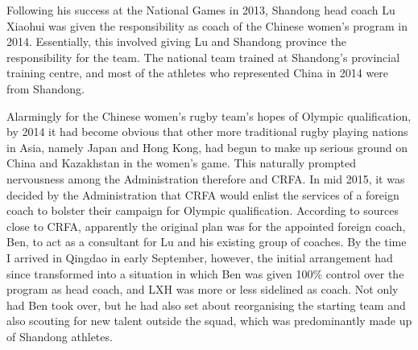 \begin{CJK}{UTF8}{gbsn}
  Following his success at the National Games in 2013, Shandong head coach Lu Xiaohui was given the responsibility as coach of the Chinese women's program in 2014.  Essentially, this involved giving Lu and  Shandong province the responsibility for the team.  The national team trained at Shandong's provincial training centre, and most of the athletes who represented China in 2014 were from Shandong.

  Alarmingly for the Chinese women's rugby team's hopes of Olympic qualification, by 2014 it had become obvious that other more traditional rugby playing nations in Asia, namely Japan and Hong Kong, had begun to make up serious ground on China and Kazakhstan in the women's game.  This naturally prompted nervousness among the Administration therefore and CRFA.  In mid 2015, it was decided by the Administration that CRFA would enlist the services of a foreign coach to bolster their campaign for Olympic qualification.  According to sources close to CRFA, apparently the original plan was for the appointed foreign coach, Ben, to act as a consultant for Lu and his existing group of coaches.  By the time I arrived in Qingdao in early September, however, the initial arrangement had since transformed into a situation in which Ben was given 100\% control over the program as head coach, and LXH was more or less sidelined as coach. Not only had Ben took over, but he had also set about reorganising the starting team and also scouting for new talent outside the squad, which was predominantly made up of Shandong athletes.



\end{CJK}
